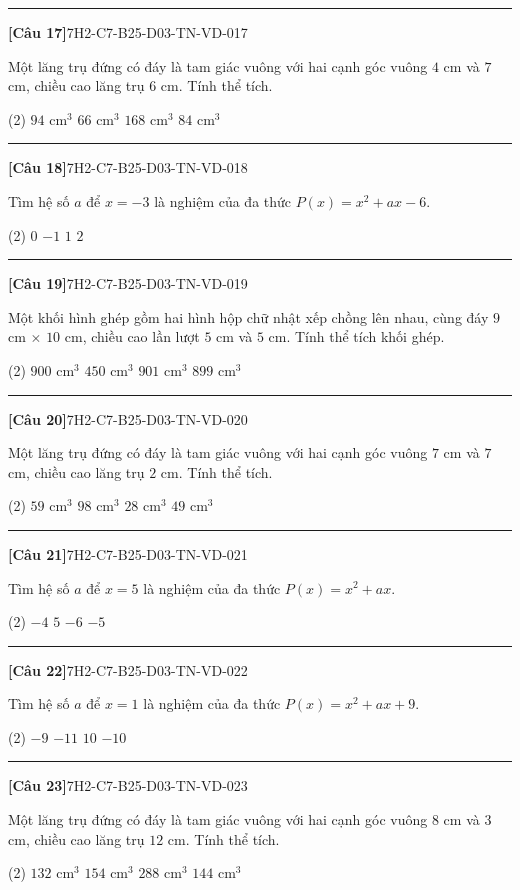 \documentclass[12pt,a4paper]{article}
\newif\ifloigiai
\newenvironment{cauhoi}[2]{%
  \par\medskip\noindent\rule{\textwidth}{0.4pt}\par\nopagebreak
  \noindent\textbf{[#1]}\hfill{\scriptsize\ttfamily #2}\par\nopagebreak\smallskip}{\par}
\newcommand{\dapan}[1]{\ifloigiai\par\smallskip\noindent\textit{Đáp án:} \textbf{#1}\par\fi}
\begin{document}
\begin{cauhoi}{Câu 17}{7H2-C7-B25-D03-TN-VD-017}
Một lăng trụ đứng có đáy là tam giác vuông với hai cạnh góc vuông $4$ cm và $7$ cm, chiều cao lăng trụ $6$ cm. Tính thể tích.
\begin{tasks}(2)
\task $94\text{ cm}^3$
\task $66\text{ cm}^3$
\task $168\text{ cm}^3$
\task $84\text{ cm}^3$
\end{tasks}
\dapan{D}
\end{cauhoi}
\begin{cauhoi}{Câu 18}{7H2-C7-B25-D03-TN-VD-018}
Tìm hệ số $a$ để $x=-3$ là nghiệm của đa thức $P(x)=x^{2}+ax-6$.
\begin{tasks}(2)
\task $0$
\task $-1$
\task $1$
\task $2$
\end{tasks}
\dapan{C}
\end{cauhoi}
\begin{cauhoi}{Câu 19}{7H2-C7-B25-D03-TN-VD-019}
Một khối hình ghép gồm hai hình hộp chữ nhật xếp chồng lên nhau, cùng đáy $9$ cm $\times$ $10$ cm, chiều cao lần lượt $5$ cm và $5$ cm. Tính thể tích khối ghép.
\begin{tasks}(2)
\task $900\text{ cm}^3$
\task $450\text{ cm}^3$
\task $901\text{ cm}^3$
\task $899\text{ cm}^3$
\end{tasks}
\dapan{A}
\end{cauhoi}
\begin{cauhoi}{Câu 20}{7H2-C7-B25-D03-TN-VD-020}
Một lăng trụ đứng có đáy là tam giác vuông với hai cạnh góc vuông $7$ cm và $7$ cm, chiều cao lăng trụ $2$ cm. Tính thể tích.
\begin{tasks}(2)
\task $59\text{ cm}^3$
\task $98\text{ cm}^3$
\task $28\text{ cm}^3$
\task $49\text{ cm}^3$
\end{tasks}
\dapan{D}
\end{cauhoi}
\begin{cauhoi}{Câu 21}{7H2-C7-B25-D03-TN-VD-021}
Tìm hệ số $a$ để $x=5$ là nghiệm của đa thức $P(x)=x^{2}+ax$.
\begin{tasks}(2)
\task $-4$
\task $5$
\task $-6$
\task $-5$
\end{tasks}
\dapan{D}
\end{cauhoi}
\begin{cauhoi}{Câu 22}{7H2-C7-B25-D03-TN-VD-022}
Tìm hệ số $a$ để $x=1$ là nghiệm của đa thức $P(x)=x^{2}+ax+9$.
\begin{tasks}(2)
\task $-9$
\task $-11$
\task $10$
\task $-10$
\end{tasks}
\dapan{D}
\end{cauhoi}
\begin{cauhoi}{Câu 23}{7H2-C7-B25-D03-TN-VD-023}
Một lăng trụ đứng có đáy là tam giác vuông với hai cạnh góc vuông $8$ cm và $3$ cm, chiều cao lăng trụ $12$ cm. Tính thể tích.
\begin{tasks}(2)
\task $132\text{ cm}^3$
\task $154\text{ cm}^3$
\task $288\text{ cm}^3$
\task $144\text{ cm}^3$
\end{tasks}
\dapan{D}
\end{cauhoi}
\end{document}
